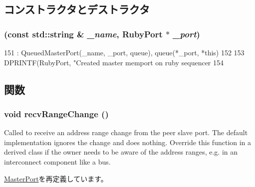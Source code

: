 \subsection{コンストラクタとデストラクタ}
\hypertarget{classRubyPort_1_1MemMasterPort_a9a3e2dce04377a6628c5a4ae457d6fdc}{
\subsubsection[{MemMasterPort}]{ (const std::string \& {\em \_\-name}, \/  {\bf RubyPort} $\ast$ {\em \_\-port})}}
\label{classRubyPort_1_1MemMasterPort_a9a3e2dce04377a6628c5a4ae457d6fdc}



\begin{DoxyCode}
151     : QueuedMasterPort(_name, _port, queue), queue(*_port, *this)
152 {
153     DPRINTF(RubyPort, "Created master memport on ruby sequencer %
154 }
\end{DoxyCode}


\subsection{関数}
\hypertarget{classRubyPort_1_1MemMasterPort_aecf310a01b533ae8700eccac2cf20480}{
\subsubsection[{recvRangeChange}]{\setlength{\rightskip}{0pt plus 5cm}void recvRangeChange ()}}
\label{classRubyPort_1_1MemMasterPort_aecf310a01b533ae8700eccac2cf20480}
Called to receive an address range change from the peer slave port. The default implementation ignores the change and does nothing. Override this function in a derived class if the owner needs to be aware of the address ranges, e.g. in an interconnect component like a bus. 

\hyperlink{classMasterPort_af60d9c2c17fb4c9ebc5384a7e0c9f289}{MasterPort}を再定義しています。


